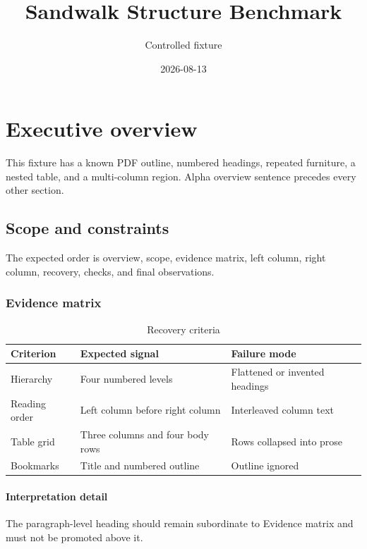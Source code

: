 \documentclass[10pt]{article}
\title{Sandwalk Structure Benchmark}
\author{Controlled fixture}
\date{2026-08-13}
\begin{document}
\maketitle
\tableofcontents
\newpage
\section{Executive overview}
This fixture has a known PDF outline, numbered headings, repeated furniture, a nested table, and a multi-column region. Alpha overview sentence precedes every other section.
\subsection{Scope and constraints}
The expected order is overview, scope, evidence matrix, left column, right column, recovery, checks, and final observations.
\subsubsection{Evidence matrix}
\begin{table}[h]
\centering
\caption{Recovery criteria}
\begin{tabular}{>{\raggedright\arraybackslash}p{30mm}p{42mm}p{42mm}}
\toprule
Criterion & Expected signal & Failure mode \\
\midrule
Hierarchy & Four numbered levels & Flattened or invented headings \\
Reading order & Left column before right column & Interleaved column text \\
Table grid & Three columns and four body rows & Rows collapsed into prose \\
Bookmarks & Title and numbered outline & Outline ignored \\
\bottomrule
\end{tabular}
\end{table}
\paragraph{Interpretation detail}
The paragraph-level heading should remain subordinate to Evidence matrix and must not be promoted above it.
\end{document}
